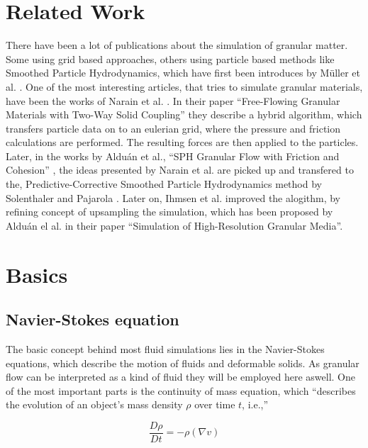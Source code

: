 \documentclass[intern]{cgMA}
\begin{document}
    \section{Related Work}
    There have been a lot of publications about the simulation of granular matter. Some using grid based approaches, others using particle based methods like Smoothed Particle Hydrodynamics, which have first been introduces by Müller et al. \cite{10.5555/846276.846298}. One of the most interesting articles, that tries to simulate granular materials, have been the works of Narain et al. \cite{10.1145/1866158.1866195}. In their paper \enquote{Free-Flowing Granular Materials with Two-Way Solid Coupling} they describe a hybrid algorithm, which transfers particle data on to an eulerian grid, where the pressure and friction calculations are performed. The resulting forces are then applied to the particles. Later, in the works by Alduán et al., \enquote{SPH Granular Flow with Friction and Cohesion} \cite{10.1145/2019406.2019410}, the ideas presented by Narain et al. \cite{10.1145/1866158.1866195} are picked up and transfered to the, Predictive-Corrective Smoothed Particle Hydrodynamics method by Solenthaler and Pajarola \cite{10.1145/1576246.1531346}. Later on, Ihmsen et al. \cite{10.2312:PE:vriphys:vriphys12:053-060} improved the alogithm, by refining concept of upsampling the simulation, which has been proposed by Alduán el al. \cite{10.2312:LocalChapterEvents:CEIG:CEIG09:011-018} in their paper \enquote{Simulation of High-Resolution Granular Media}. 
    \pagebreak
    
    \section{Basics}\label{sec:basics}

    \subsection{Navier-Stokes equation}
    The basic concept behind most fluid simulations lies in the Navier-Stokes equations, which describe the motion of fluids and deformable solids. As granular flow can be interpreted as a kind of fluid they will be employed here aswell. One of the most important parts is the continuity of mass equation, which \enquote{describes the evolution of an object's mass density $\rho$ over time $t$, i.e.,} \cite{survey_on_sph}
    
    \begin{equation}
        \frac{D \rho}{D t} = -\rho(\nabla v)
    \end{equation}
\end{document}
